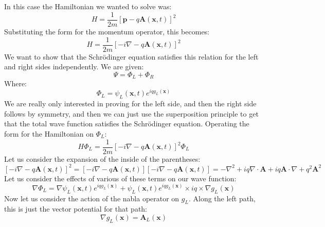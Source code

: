 \documentclass[12pt]{article}
\begin{document}
\subsection{}
In this case the Hamiltonian we wanted to solve was:
\begin{equation}
  H=\frac{1}{2 m}[\mathbf{p}-q \mathbf{A}(\mathbf{x}, t)]^{2}
\end{equation}
Substituting the form for the momentum operator, this becomes:
\begin{equation}
  H=\frac{1}{2 m}[-i \nabla -q \mathbf{A}(\mathbf{x}, t)]^{2}
\end{equation}
We want to show that the Schrödinger equation satisfies this relation for the left and right sides independently.
We are given:
\begin{equation}
  \Psi  = \Phi_L + \Phi_R 
\end{equation}
Where:
\begin{equation}
  \Phi_L = \psi_{L}(\mathbf{x}, t) e^{i q g_{L}(\mathbf{x})}
\end{equation}
We are really only interested in proving for the left side, and then the right side follows by symmetry, and then we can just use the superposition principle to get that the total wave function satisfies the Schrödinger equation.
Operating the form for the Hamiltonian on $\Phi_L$:
\begin{equation}
  H \Phi_L = \frac{1}{2 m}[-i \nabla -q \mathbf{A}(\mathbf{x}, t)]^{2} \Phi_L
\end{equation}
Let us consider the expansion of the inside of the parentheses:
\begin{equation}
  \left[-i \nabla -q \mathbf{A}(\mathbf{x}, t)\right]^{2} = \left[-i \nabla -q \mathbf{A}(\mathbf{x}, t)\right] \left[-i \nabla -q \mathbf{A}(\mathbf{x}, t)\right] = - \nabla^2 + i q \nabla \cdot \mathbf{A} + i q \mathbf{A} \cdot \nabla + q^2 \mathbf{A}^2
\end{equation}
Let us consider the effects of various of these terms on our wave function:
\begin{equation}
  \nabla \Phi_L = \nabla \psi_{L}(\mathbf{x}, t) e^{i q g_{L}(\mathbf{x})} + \psi_{L}(\mathbf{x}, t) e^{i q g_{L}(\mathbf{x})} \times i q \times \nabla g_{L}(\mathbf{x})
\end{equation}
Now let us consider the action of the nabla operator on $g_L$. Along the left path, this is just the vector potential for that path:
\begin{equation}
  \nabla g_L(\mathbf{x}) = \mathbf{A}_L(\mathbf{x})
\end{equation}
\end{document}
